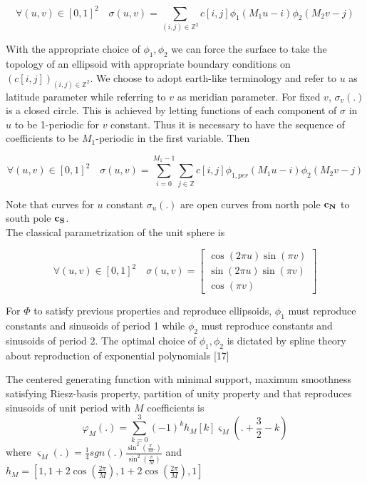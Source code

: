 \documentclass[a4paper, 11pt]{article}
\begin{document}
\begin{equation}
  \forall (u, v) \in {[0,1]}^2 \quad \sigma(u,v) = \sum_{(i,j) \in \mathbb{Z}^2} c[i,j] \phi_1(M_1u-i)\phi_2(M_2v-j)
\end{equation}

With the appropriate choice of $\phi_1, \phi_2$ we can force the surface to take the topology of an ellipsoid with 
appropriate boundary conditions on ${(c[i,j])}_{(i,j) \in \mathbb{Z}^2}$. We choose to adopt earth-like terminology and 
refer to $u$ as latitude parameter while referring to $v$ as meridian parameter. For fixed $v$, $\sigma_{v}(.)$ is a 
closed circle.  This is achieved by letting functions of each component of $\sigma$  in $u$ to be 1-periodic for $v$ 
constant. Thus it is necessary to have the sequence of coefficients to be $M_1$-periodic in the first variable. Then

\begin{equation}
  \forall (u, v) \in {[0,1]}^2 \quad \sigma(u,v) = \sum_{i=0}^{M_1-1} \sum_{j \in \mathbb{Z}} c[i,j] \phi_{1, per} 
  (M_1u-i)\phi_2(M_2v-j)
\end{equation}

Note that curves for $u$ constant $\sigma_{u}(.)$ are open curves from north pole ${\bf c_N}$ to south pole ${\bf c_S}$.  
\\

The classical parametrization of the unit sphere is

\begin{equation*}
  \forall (u, v) \in {[0,1]}^2 \quad \sigma(u, v) = 
  \begin{bmatrix} \cos (2\pi u) \sin(\pi v) \\ \sin (2\pi u) \sin(\pi v) \\ \cos (\pi v) \end{bmatrix} 
\end{equation*}

For $\Phi$ to satisfy previous properties and reproduce ellipsoids, $\phi_1$ must reproduce constants and sinusoids of 
period 1 while $\phi_2$ must reproduce constants and sinusoids of period 2. The optimal choice of $\phi_1, \phi_2$ is 
dictated by spline theory about reproduction of exponential polynomials [17]

\begin{thm}{1}
  The centered generating function with minimal support, maximum smoothness satisfying Riesz-basis property, partition 
  of unity property and that reproduces sinusoids of unit period with $M$ coefficients is
  \begin{equation}
    \varphi_{M}(.) = \sum_{k=0}^3 {(-1)}^k h_{M}[k] \varsigma_M(. + \frac{3}{2} - k)
  \end{equation}
  where $\varsigma_M(.) = \frac{1}{4} sgn(.) \frac{\sin^2(\frac{\pi}{M}.)}{\sin^2(\frac{\pi}{M})}$ and $h_M = [1, 
1+2\cos(\frac{2\pi}{M}), 1+2\cos(\frac{2\pi}{M}), 1]$ 
\end{thm}
\end{document}
